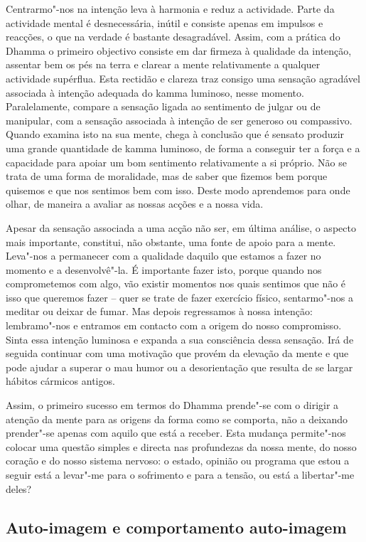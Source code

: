 Centrarmo"-nos na intenção leva à harmonia e reduz a actividade. Parte da
actividade mental é desnecessária, inútil e consiste apenas em impulsos e
reacções, o que na verdade é bastante desagradável. Assim, com a prática do
Dhamma o primeiro objectivo consiste em dar firmeza à qualidade da intenção,
assentar bem os pés na terra e clarear a mente relativamente a qualquer
actividade supérflua. Esta rectidão e clareza traz consigo uma sensação
agradável associada à intenção adequada do kamma luminoso, nesse momento.
Paralelamente, compare a sensação ligada ao sentimento de julgar ou de
manipular, com a sensação associada à intenção de ser generoso ou compassivo.
Quando examina isto na sua mente, chega à conclusão que é sensato produzir uma
grande quantidade de kamma luminoso, de forma a conseguir ter a força e a
capacidade para apoiar um bom sentimento relativamente a si próprio. Não se
trata de uma forma de moralidade, mas de saber que fizemos bem porque quisemos e
que nos sentimos bem com isso. Deste modo aprendemos para onde olhar, de maneira
a avaliar as nossas acções e a nossa vida.

Apesar da sensação associada a uma acção não ser, em última análise, o aspecto
mais importante, constitui, não obstante, uma fonte de apoio para a mente.
Leva"-nos a permanecer com a qualidade daquilo que estamos a fazer no momento e
a desenvolvê"-la. É importante fazer isto, porque quando nos comprometemos com
algo, vão existir momentos nos quais sentimos que não é isso que queremos fazer
-- quer se trate de fazer exercício físico, sentarmo"-nos a meditar ou deixar de
fumar. Mas depois regressamos à nossa intenção: lembramo"-nos e entramos em
contacto com a origem do nosso compromisso. Sinta essa intenção luminosa e
expanda a sua consciência dessa sensação. Irá de seguida continuar com uma
motivação que provém da elevação da mente e que pode ajudar a superar o mau
humor ou a desorientação que resulta de se largar hábitos cármicos antigos.

Assim, o primeiro sucesso em termos do Dhamma prende"-se com o dirigir a atenção
da mente para as origens da forma como se comporta, não a deixando prender"-se
apenas com aquilo que está a receber. Esta mudança permite"-nos colocar uma
questão simples e directa nas profundezas da nossa mente, do nosso coração e do
nosso sistema nervoso: o estado, opinião ou programa que estou a seguir está a
levar"-me para o sofrimento e para a tensão, ou está a libertar"-me deles?

\subsection{Auto-imagem e comportamento auto-imagem}

